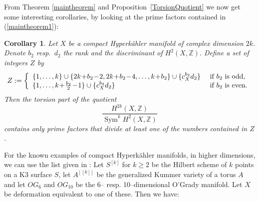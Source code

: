 \documentclass{amsart}
\DeclareMathOperator{\Sym}{Sym}
\newcommand{\coloneqq}{:=}
\newcommand{\Z}{\mathbb{Z}}
\theoremstyle{plain}
\newtheorem{corollary}[theorem]{Corollary}
\theoremstyle{definition}
\theoremstyle{remark}
\begin{document}
From Theorem \ref{maintheorem} and Proposition~\ref{TorsionQuotient} we now get some interesting corollaries, by looking at the prime factors contained in (\ref{maintheorem1}):
\begin{corollary}
Let $X$ be a compact Hyperk\"ahler manifold of complex dimension $2k$. Denote $b_2$ resp.~$d_2$ the rank and the discriminant of $H^2(X,\Z)$. Define a set of integers $Z$ by
$$
Z \coloneqq \left\{
 \begin{array}{*2{l}p{5cm}}
  \{1,\ldots ,k\} \cup \{2k\!+\!b_2\!-\!2, 2k\!+\!b_2\!-\!4,\ldots,k\!+\!b_2\}\cup\{c_X^{b_2} d_2\}  &\text{if }b_2\text{ is odd}, \\
  \{1,\ldots , k\!+\! \frac{b_2}{2}\!-\!1\} \cup\{c_X^{b_2} d_2\}  &\text{if }b_2\text{ is even}.
\end{array}
\right.
$$
Then the torsion part of the quotient
$$
\frac{H^{2k}(X,\Z)}{\Sym^kH^2(X,\Z)}
$$
contains only prime factors that divide at least one of the numbers contained in $Z$.
\end{corollary}
For the known examples of compact Hyperk\"ahler manifolds, in higher dimensions, we can use the list given in \cite[Table~1]{OGrady}:
Let $S^{[k]}$ for $k\geq 2$ be the Hilbert scheme of $k$ points on a K3 surface $S$, let $A^{[[k]]}$ be the generalized Kummer variety of a torus $A$ and let $OG_6$ and $OG_{10}$ be the 6-- resp. 10--dimensional O'Grady manifold. Let $X$ be deformation equivalent to one of these. Then we have:
\end{document}
